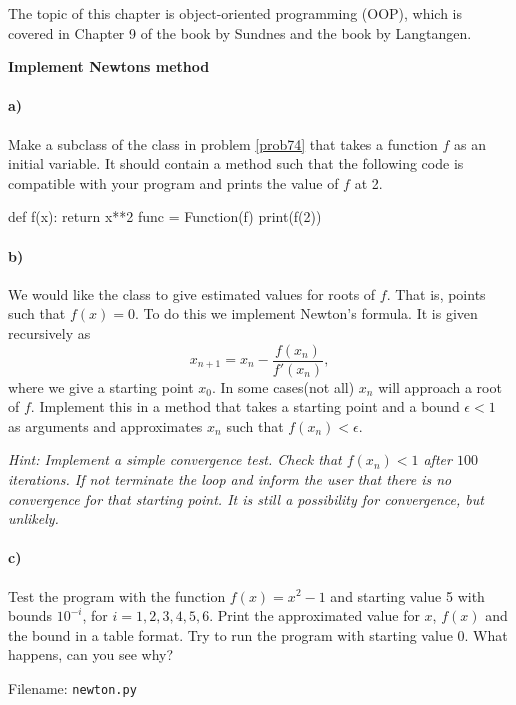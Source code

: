 The topic of this chapter is object-oriented programming (OOP), which is
covered in Chapter 9 of the book by Sundnes and the book by Langtangen.


\begin{Problem}{\textbf{Implement Newtons method}} \label{prob91}

\paragraph{a)}
Make a subclass  of the class  in problem \ref{prob74}
that takes a function $f$ as
an initial variable. It should contain a method such that the following code
is compatible with your program and prints the value of $f$ at 2.
\begin{python}
def f(x):
    return x**2
func = Function(f)
print(f(2))
\end{python}

\paragraph{b)}
We would like the class to give estimated values for roots of $f$. That is,
points such that $f(x)=0$. To do this we implement Newton's formula. It is given
recursively as
\begin{equation*}
    x_{n+1}=x_n-\frac{f(x_n)}{f'(x_n)},
\end{equation*}
where we give a starting point $x_0$. In some cases(not all) $x_n$ will approach
a root of $f$. Implement this in a method  that takes a
starting point and a bound $\epsilon<1$ as arguments and approximates $x_n$ such that
$f(x_n)<\epsilon$.

\emph{Hint: Implement a simple convergence test. Check that $f(x_n)<1$ after $100$ iterations. If
not terminate the loop and inform the user that there is no convergence for that
starting point. It is still a possibility for convergence, but unlikely.}

\paragraph{c)}
Test the program with the function $f(x)=x^2-1$ and starting value 5 with bounds
$10^{-i}$, for $i=1,2,3,4,5,6$. Print the approximated value for $x$, $f(x)$ and the
bound in a table format. Try to run the program with starting value 0. What happens,
can you see why?

Filename: \texttt{newton.py}
\end{Problem}

